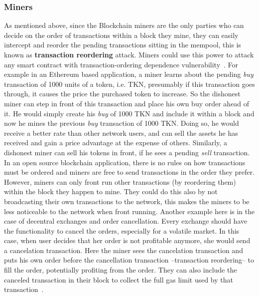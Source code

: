 \subsubsection{Miners}
As mentioned above, since the Blockchain miners are the only parties who can decide on the order of transactions within a block they mine, they can easily intercept and reorder the pending transactions sitting in the mempool, this is known as \textbf{transaction reordering} attack. Miners could use this power to attack any smart contract with transaction-ordering dependence vulnerability~\cite{luu2016making}.  For example in an Ethereum based application, a miner learns about the pending \textit{buy} transaction of 1000 units of a token, i.e. TKN, presumably if this transaction goes through, it causes the price the purchased token to increase. So the dishonest miner can step in front of this transaction and  place his own buy order ahead of it. He would simply create his \textit{buy} of 1000 TKN and include it within a block and now he mines the previous \textit{buy} transaction of 1000 TKN. Doing so, he would receive a better rate than other network users, and can sell the assets he has received and gain a price advantage at the expense of others. Similarly, a dishonest miner can sell his tokens in front, if he sees a pending \textit{sell} transaction. In an open source blockchain application, there is no rules on how transactions must be ordered and miners are free to send transactions in the order they prefer. However, miners can only front run other transactions (by reordering them) within the block they happen to mine. They could do this also by not broadcasting their own transactions to the network, this makes the miners to be less noticeable to the network when front running.
Another example here is in the case of decentral exchanges and order cancellation. Every exchange should have the functionality to cancel the orders, especially for a volatile market. In this case, when user decides that her order is not profitable anymore, she would send a cancelation transaction. Here the miner sees the cancelation transaction and puts his own order before the cancellation transaction --transaction reordering-- to fill the order, potentially profiting from the order. They can also include the canceled transaction in their block to collect the full gas limit used by that transaction~\cite{CostofDecentralization:online}.


